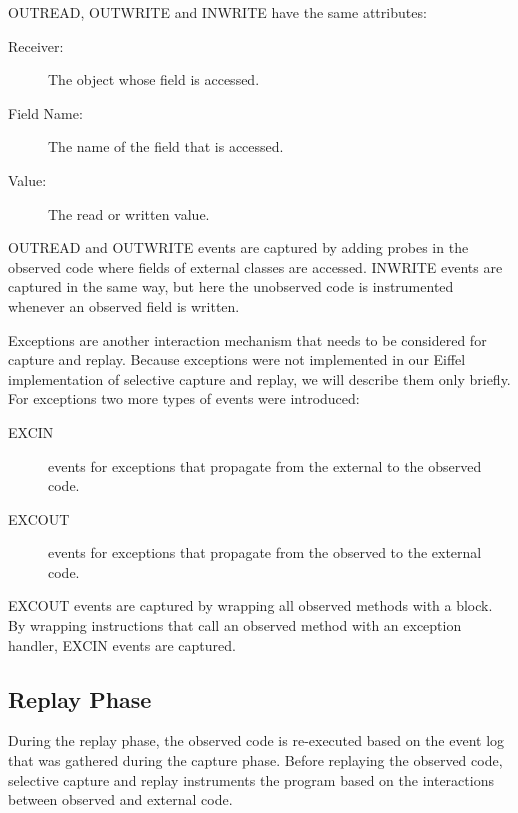 OUTREAD, OUTWRITE and INWRITE have the same attributes:

\begin{description}
 \item [Receiver:] The object whose field is accessed.
 \item [Field Name:] The name of the field that is accessed.
 \item [Value:] The read or written value.
\end{description}

OUTREAD and OUTWRITE events are captured by adding probes in the observed code where fields of external classes are accessed. INWRITE events are captured in the same way, but here the unobserved code is instrumented whenever an observed field is written. 

Exceptions are another interaction mechanism that needs to be considered for capture and replay. Because exceptions were not implemented in our Eiffel implementation of selective capture and replay, we will describe them only briefly. For exceptions two more types of events were introduced:
\begin{description}
 \item [EXCIN] events for exceptions that propagate from the external to the observed code.
 \item [EXCOUT] events for exceptions that propagate from the observed to the external code.
\end{description}
EXCOUT events are captured by wrapping all observed methods with a  block. By wrapping instructions that call an observed method with an exception handler,  EXCIN events are captured.

\subsection{Replay Phase}
During the replay phase, the observed code is re-executed based on the event log that was gathered during the capture phase. Before replaying the observed code, selective capture and replay instruments the program based on the interactions between observed and external code. 

